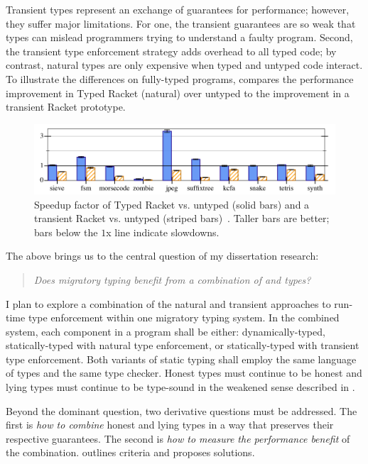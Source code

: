 Transient types represent an exchange of guarantees for performance;
 however, they suffer major limitations.
For one, the transient guarantees are so weak that types can mislead
 programmers trying to understand a faulty program.
Second, the transient type enforcement strategy adds overhead to all typed code;
 by contrast, natural types are only expensive when typed and untyped code interact.
To illustrate the differences on fully-typed programs,
  compares the performance improvement
 in Typed Racket (natural) over untyped to the improvement in a
 transient Racket prototype.

\begin{figure}[b]
  \includegraphics[width=0.8\columnwidth]{src/icfp-bars.png}
  \caption{Speedup factor of Typed Racket vs. untyped (solid bars) and a transient Racket vs. untyped (striped bars)~\cite{gf-icfp-2018}.
           Taller bars are better; bars below the $1$x line indicate slowdowns.}
  \label{fig:icfp-bars}
\end{figure}

The above brings us to the central question of my dissertation research:

\begin{quote}
  \emph{Does migratory typing benefit from a combination of \tdeep{} and \tshallow{} types?}
\end{quote}

I plan to explore a combination of the natural and transient approaches to
 run-time type enforcement within one migratory typing system.
In the combined system, each component in a program shall be either:
 dynamically-typed,
 statically-typed with natural type enforcement,
 or statically-typed with transient type enforcement.
Both variants of static typing shall employ the same language of types and the
 same type checker.
Honest types must continue to be honest
 and lying types must continue to be type-sound
 in the weakened sense described in .

Beyond the dominant question, two derivative questions must be addressed.
The first is \emph{how to combine}\/ honest and lying
 types in a way that preserves their respective guarantees.
The second is \emph{how to measure the performance benefit}\/ of the combination.
 outlines criteria and proposes solutions.


